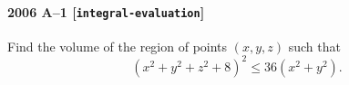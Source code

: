 \paragraph{2006 A--1 \textnormal{[\texttt{integral-evaluation}]}}
Find the volume of the region of points $(x,y,z)$ such that
\[
(x^2 + y^2 + z^2 + 8)^2 \leq 36(x^2 + y^2).
\]
